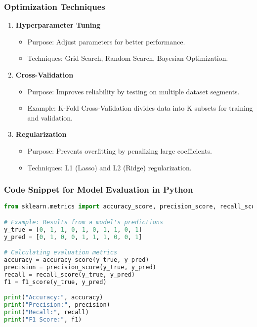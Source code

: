 \documentclass[aspectratio=169]{beamer}
\begin{document}
\begin{frame}
    \frametitle{Optimization Techniques}
    \begin{enumerate}
        \item \textbf{Hyperparameter Tuning}
            \begin{itemize}
                \item Purpose: Adjust parameters for better performance.
                \item Techniques: Grid Search, Random Search, Bayesian Optimization.
            \end{itemize}
        \item \textbf{Cross-Validation}
            \begin{itemize}
                \item Purpose: Improves reliability by testing on multiple dataset segments.
                \item Example: K-Fold Cross-Validation divides data into K subsets for training and validation.
            \end{itemize}
        \item \textbf{Regularization}
            \begin{itemize}
                \item Purpose: Prevents overfitting by penalizing large coefficients.
                \item Techniques: L1 (Lasso) and L2 (Ridge) regularization.
            \end{itemize}
    \end{enumerate}
\end{frame}

\begin{frame}[fragile]
    \frametitle{Code Snippet for Model Evaluation in Python}
    \begin{lstlisting}[language=Python]
from sklearn.metrics import accuracy_score, precision_score, recall_score, f1_score

# Example: Results from a model's predictions
y_true = [0, 1, 1, 0, 1, 0, 1, 1, 0, 1]
y_pred = [0, 1, 0, 0, 1, 1, 1, 0, 0, 1]

# Calculating evaluation metrics
accuracy = accuracy_score(y_true, y_pred)
precision = precision_score(y_true, y_pred)
recall = recall_score(y_true, y_pred)
f1 = f1_score(y_true, y_pred)

print("Accuracy:", accuracy)
print("Precision:", precision)
print("Recall:", recall)
print("F1 Score:", f1)
    \end{lstlisting}
\end{frame}
\end{document}
